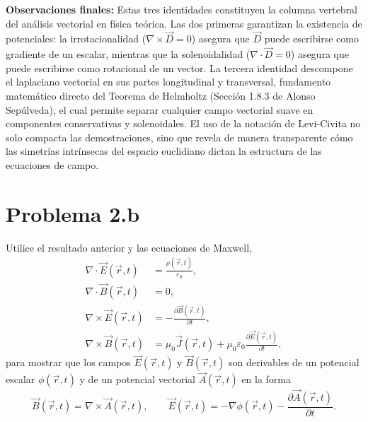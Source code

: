 \documentclass[a4paper]{article}
\begin{document}
\vspace{0.3cm}
\noindent\textbf{Observaciones finales:}
Estas tres identidades constituyen la columna vertebral del análisis vectorial en física teórica. Las dos primeras garantizan la existencia de potenciales: la irrotacionalidad ($\nabla \times \vec{D}=0$) asegura que $\vec{D}$ puede escribirse como gradiente de un escalar, mientras que la solenoidalidad ($\nabla \cdot \vec{D}=0$) asegura que puede escribirse como rotacional de un vector. La tercera identidad descompone el laplaciano vectorial en sus partes longitudinal y transversal, fundamento matemático directo del Teorema de Helmholtz (Sección 1.8.3 de Alonso Sepúlveda), el cual permite separar cualquier campo vectorial suave en componentes conservativas y solenoidales. El uso de la notación de Levi-Civita no solo compacta las demostraciones, sino que revela de manera transparente cómo las simetrías intrínsecas del espacio euclidiano dictan la estructura de las ecuaciones de campo.


\section{Problema 2.b}
Utilice el resultado anterior y las ecuaciones de Maxwell,
\begin{align*}
\nabla \cdot \vec{E}(\vec{r},t) &= \frac{\rho(\vec{r},t)}{\varepsilon_0}, \\
\nabla \cdot \vec{B}(\vec{r},t) &= 0, \\
\nabla \times \vec{E}(\vec{r},t) &= -\frac{\partial \vec{B}(\vec{r},t)}{\partial t}, \\
\nabla \times \vec{B}(\vec{r},t) &= \mu_0 \vec{J}(\vec{r},t) + \mu_0\varepsilon_0 \frac{\partial \vec{E}(\vec{r},t)}{\partial t},
\end{align*}
para mostrar que los campos $\vec{E}(\vec{r},t)$ y $\vec{B}(\vec{r},t)$ son derivables de un potencial escalar $\phi(\vec{r},t)$ y de un potencial vectorial $\vec{A}(\vec{r},t)$ en la forma
$$
\vec{B}(\vec{r},t)=\nabla \times \vec{A}(\vec{r},t), \qquad \vec{E}(\vec{r},t)=-\nabla\phi(\vec{r},t)-\frac{\partial \vec{A}(\vec{r},t)}{\partial t}.
$$
\end{document}
